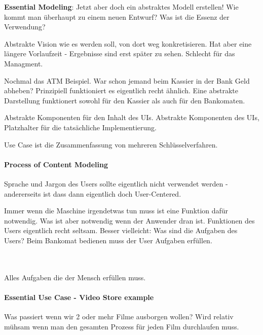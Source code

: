 \textbf{Essential Modeling}: Jetzt aber doch ein abstraktes Modell erstellen! 
Wie kommt man überhaupt zu einem neuen Entwurf? Was ist die Essenz der Verwendung?

Abstrakte Vision wie es werden soll, von dort weg konkretisieren. Hat aber eine
längere Vorlaufzeit - Ergebnisse sind erst später zu sehen. Schlecht für das
Managment.


Nochmal das ATM Beispiel. War schon jemand beim Kassier in der Bank Geld abheben? 
Prinzipiell funktioniert es eigentlich recht ähnlich. 
Eine abstrakte Darstellung funktionert sowohl für den Kassier als auch für den
Bankomaten. 

Abstrakte Komponenten für den Inhalt des UIs. Abstrakte Komponenten des UIs,
Platzhalter für die tatsächliche Implementierung. 

Use Case ist die Zusammenfassung von mehreren Schlüsselverfahren.

\paragraph{Process of Content Modeling}
Sprache und Jargon des Users sollte eigentlich nicht verwendet werden - 
andererseits ist dass dann eigentlich doch User-Centered.

Immer wenn die Maschine irgendetwas tun muss ist eine Funktion dafür notwendig.
Was ist aber notwendig wenn der Anwender dran ist. Funktionen des Users eigentlich
recht seltsam. Besser vielleicht: Was sind die Aufgaben des Users?
Beim Bankomat bedienen muss der User Aufgaben erfüllen.


\\
\noindent{}
\\

Alles Aufgaben die der Mensch erfüllen muss. 

\paragraph{Essential Use Case - Video Store example}
Was passiert wenn wir 2 oder mehr Filme ausborgen wollen? Wird relativ mühsam
wenn man den gesamten Prozess für jeden Film durchlaufen muss. 

